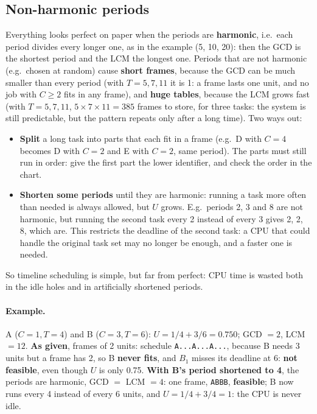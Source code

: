 \subsection{Non-harmonic periods}
Everything looks perfect on paper when the periods are \textbf{harmonic}, i.e.\ each period divides every longer one, as in the example (5, 10, 20): then the GCD is the shortest period and the LCM the longest one. Periods that are not harmonic (e.g.\ chosen at random) cause \textbf{short frames}, because the GCD can be much smaller than every period (with $T = 5, 7, 11$ it is 1: a frame lasts one unit, and no job with $C \ge 2$ fits in any frame), and \textbf{huge tables}, because the LCM grows fast (with $T = 5, 7, 11$, $5 \times 7 \times 11 = 385$ frames to store, for three tasks: the system is still predictable, but the pattern repeats only after a long time). Two ways out:
\begin{itemize}
    \item \textbf{Split} a long task into parts that each fit in a frame (e.g.\ D with $C = 4$ becomes D with $C = 2$ and E with $C = 2$, same period). The parts must still run in order: give the first part the lower identifier, and check the order in the chart.
    \item \textbf{Shorten some periods} until they are harmonic: running a task more often than needed is always allowed, but $U$ grows. E.g.\ periods 2, 3 and 8 are not harmonic, but running the second task every 2 instead of every 3 gives 2, 2, 8, which are. This restricts the deadline of the second task: a CPU that could handle the original task set may no longer be enough, and a faster one is needed.
\end{itemize}
So timeline scheduling is simple, but far from perfect: CPU time is wasted both in the idle holes and in artificially shortened periods.

\paragraph{Example.} A ($C = 1, T = 4$) and B ($C = 3, T = 6$): $U = 1/4 + 3/6 = 0.750$; GCD $= 2$, LCM $= 12$. \textbf{As given}, frames of 2 units: schedule \texttt{A...A...A...}, because B needs 3 units but a frame has 2, so B \textbf{never fits}, and $B_1$ misses its deadline at 6: \textbf{not feasible}, even though $U$ is only 0.75. \textbf{With B's period shortened to 4}, the periods are harmonic, GCD $=$ LCM $= 4$: one frame, \texttt{ABBB}, \textbf{feasible}; B now runs every 4 instead of every 6 units, and $U = 1/4 + 3/4 = 1$: the CPU is never idle.

